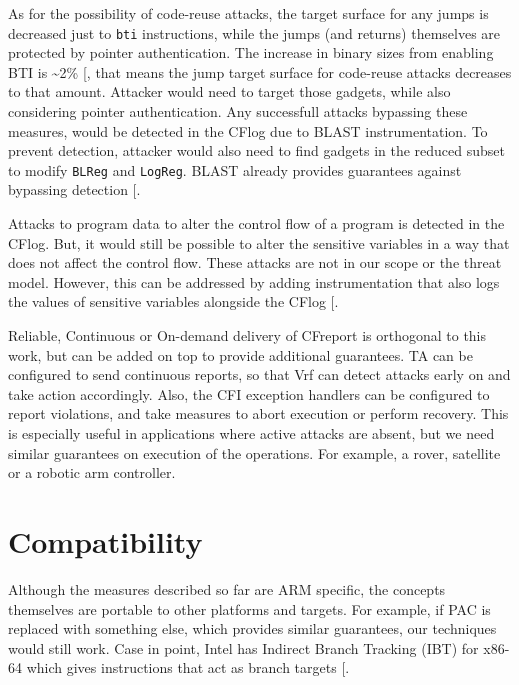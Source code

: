 \documentclass[a4paper, nobind]{templates/ociamthesis}
\begin{document}
As for the possibility of code-reuse attacks, the target surface for any jumps is
decreased just to \texttt{bti} instructions, while the jumps (and returns) themselves are
protected by pointer authentication. The increase in binary sizes from enabling BTI is \textasciitilde2\% {[}\citeproc{ref-arm-pacbti}{9}{]},
that means the jump target surface for code-reuse attacks decreases to that amount.
Attacker would need to target those gadgets, while also considering
pointer authentication. Any successfull attacks bypassing these measures, would
be detected in the CFlog due to BLAST instrumentation. To prevent detection,
attacker would also need to find gadgets in the reduced subset to modify \texttt{BLReg} and \texttt{LogReg}.
BLAST already provides guarantees against bypassing detection {[}\citeproc{ref-blast}{55}{]}.

Attacks to program data to alter the control flow of a program is detected in the CFlog.
But, it would still be possible to alter the sensitive variables in a way that
does not affect the control flow. These attacks are not in our scope or the threat model.
However, this can be addressed by adding instrumentation that also logs the values
of sensitive variables alongside the CFlog {[}\citeproc{ref-sun2020oat}{52}{]}.

Reliable, Continuous or On-demand delivery of CFreport is orthogonal to this work, but can
be added on top to provide additional guarantees. TA can be configured to send
continuous reports, so that Vrf can detect attacks early on and take action accordingly.
Also, the CFI exception handlers can be configured to report violations, and take
measures to abort execution or perform recovery. This is especially useful
in applications where active attacks are absent, but we need similar guarantees on
execution of the operations. For example, a rover, satellite or a robotic arm controller.

\section{Compatibility}\label{compatibility}

Although the measures described so far are ARM specific, the concepts themselves
are portable to other platforms and targets.
For example, if PAC is replaced with something else, which provides similar
guarantees, our techniques would still work. Case in point, Intel has Indirect
Branch Tracking (IBT) for x86-64 which gives instructions that act as branch targets {[}\citeproc{ref-intel-ibt}{32}{]}.
\end{document}
